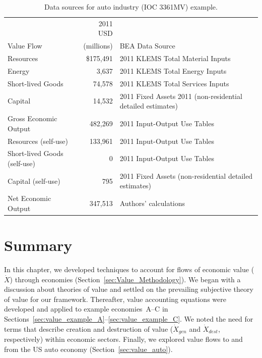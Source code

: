 \begin{table}
\caption[Data Sources for auto industry (IOC 3361MV) example]{Data sources for auto industry (IOC 3361MV) example.}
\begin{center}
  \begin{tabular}{l r @{\hspace{2em}} l}
   \toprule 
     & 2011 USD &   \\ 
Value Flow & (millions) & BEA Data Source \\
	\midrule
    Resources  & \$175,491           & 2011 KLEMS Total Material Inputs \\

   Energy &   3,637&   2011 KLEMS Total Energy Inputs                \\

    Short-lived Goods &   74,578 &   2011 KLEMS Total Services Inputs    \\
    Capital & 14,532  &  2011 Fixed Assets 2011 (non-residential detailed estimates)     \\  

    Gross Economic Output & 482,269  &   2011 Input-Output Use Tables \\

    Resources (self-use)  &  133,961 & 2011 Input-Output Use Tables     \\
 Short-lived Goods (self-use) &   0 &   2011 Input-Output Use Tables    \\
    Capital (self-use) & 795 & 2011 Fixed Assets (non-residential detailed estimates)      \\
    Net Economic Output & 347,513   &  Authors' calculations \\
    \bottomrule
  \end{tabular}

\end{center}
\label{tab:data}
\end{table}


\section{Summary}
\label{sec:value_summary}

In this chapter, we developed techniques to account for flows of economic value
($\dot{X}$) through economies 
(Section~\ref{sec:Value_Methodology}).
We began with a discussion about theories of value and settled on
the prevailing subjective theory of value for our framework.
Thereafter, value accounting equations were developed and applied to example
economies~A--C %
in Sections~\ref{sec:value_example_A}--\ref{sec:value_example_C}. 
We noted the need for terms that describe creation and destruction
of value ($\dot{X}_{gen}$ and $\dot{X}_{dest}$, respectively) 
within economic sectors.
Finally, we explored value flows 
to and from the US auto economy (Section~\ref{sec:value_auto}).

